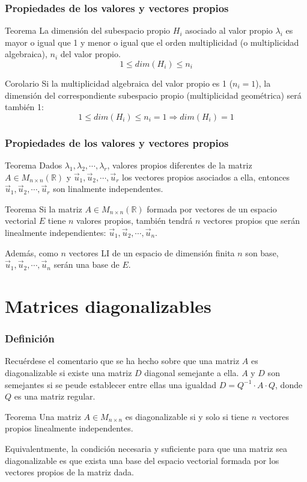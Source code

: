 \documentclass{beamer}
\begin{document}
\begin{frame}
\frametitle{Propiedades de los valores y vectores propios}
\begin{block}{Teorema}
La dimensi\'on del subespacio propio $H_i$ asociado al valor propio $\lambda_i$ es mayor o igual que 1 y menor o igual que el orden multiplicidad (o multiplicidad algebraica), $n_i$ del valor propio.
\[1\leq dim(H_i)\leq n_i\]
\end{block}

\begin{block}{Corolario}
Si la multiplicidad algebraica del valor propio es 1 ($n_i=1$), la dimensi\'on del correspondiente subespacio propio (multiplicidad geom\'etrica) ser\'a tambi\'en 1:
\[1\leq dim(H_i)\leq n_i = 1 \Rightarrow dim(H_i) = 1\]
\end{block}
\end{frame}

\begin{frame}
\frametitle{Propiedades de los valores y vectores propios}
\begin{block}{Teorema}
Dados $\lambda_1, \lambda_2, \cdots, \lambda_r$, valores propios diferentes de la matriz $A\in M_{n\times n}(\mathbb R)$ y $\vec u_1, \vec u_2, \cdots, \vec u_r$ los vectores propios asociados a ella, entonces $\vec u_1, \vec u_2, \cdots, \vec u_r$ son linalmente independentes. 
\end{block}

\begin{block}{Teorema}
Si la matriz $A\in M_{n\times n}(\mathbb R) $ formada por vectores de un espacio vectorial $E$ tiene $n$ valores propios, tambi\'en tendr\'a $n$ vectores propios que ser\'an linealmente independientes: $\vec u_1, \vec u_2, \cdots, \vec u_n$. 

Adem\'as, como $n$ vectores LI de un espacio de dimensi\'on finita $n$ son base, $\vec u_1, \vec u_2, \cdots, \vec u_n$ ser\'an una base de $E$.
\end{block}
\end{frame}


\section{Matrices diagonalizables}

\begin{frame}
\frametitle{Definici\'on}
Recu\'erdese el comentario que se ha hecho sobre que una matriz $A$ es diagonalizable si existe una matriz $D$ diagonal semejante a ella. $A$ y $D$ son semejantes si se peude establecer entre ellas una igualdad $D=Q^{-1}\cdot A \cdot Q$, donde $Q$ es una matriz regular. 

\begin{block}{Teorema}
Una matriz $A\in M_{n\times n}$ es diagonalizable si y solo si tiene $n$ vectores propios linealmente independentes. 

Equivalentmente, la condici\'on necesaria y suficiente para que una matriz sea diagonalizable es que exista una base del espacio vectorial formada por los vectores propios de la matriz dada.
\end{block}
\end{frame}
\end{document}
